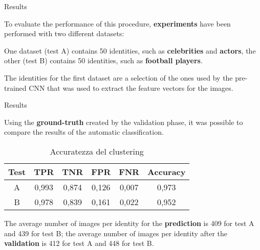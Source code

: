 \begin{tframe}{Results}

To evaluate the performance of this procedure, \textbf{experiments} have been performed with two different datasets:

\vspace{0.1in}

One dataset (test A) contains 50 identities, such as \textbf{celebrities} and \textbf{actors}, the other (test B) contains 50 identities, such as \textbf{football players}. 

\vspace{0.1in}

The identities for the first dataset are a selection of the ones used by the pre-trained CNN that was used to extract the feature vectors for the images.

\end{tframe}


\begin{tframe}{Results}

Using the \textbf{ground-truth} created by the validation phase, it was possible to compare the results of the automatic classification.

\begin{table}[ht]
\caption{Accuratezza del clustering}
\centering %
\begin{tabular}{c c c c c c} %
\hline\hline %
Test & TPR & TNR & FPR & FNR & Accuracy \\ [0.5ex] %
\hline %
A & 0,993 & 0,874 & 0,126 & 0,007 & 0,973 \\
B & 0,978 & 0,839 & 0,161 & 0,022 & 0,952 \\ [1ex] %
\hline %
\end{tabular}
\label{table:nonlin} %
\end{table}

\vspace{0.1in}

The average number of images per identity for the \textbf{prediction} is 409 for test A and 439 for test B; the average number of images per identity after the \textbf{validation} is 412 for test A and 448 for test B.

\end{tframe}